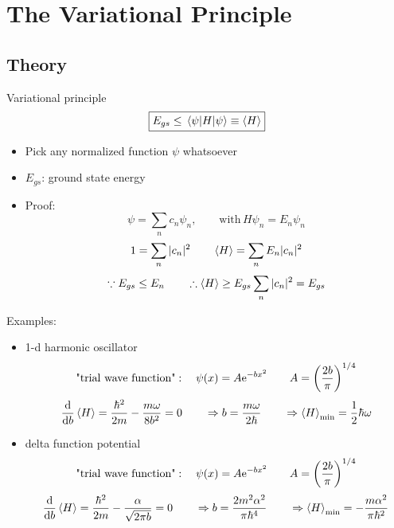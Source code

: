 \chapter{The  Variational Principle}
\section{Theory}
Variational principle
\[\boxed{E_{gs}\leq\expval{H}{\psi}\equiv\expval{H}}\]
\begin{itemize}
    \item Pick any normalized function \(\psi\) whatsoever
    \item \(E_{gs}\): ground state energy
    \item Proof:
    \[\psi=\sum_nc_n\psi_n,\qquad\text{with} \,H\psi_n = E_n\psi_n \]
    \[\begin{aligned}
        1=\sum_n|c_n|^2 \qquad\expval{H} = \sum_n E_n|c_n|^2 
    \end{aligned} \]
    \[\because E_{gs}\leq E_n \qquad \therefore \expval{H}\geq E_{gs}\sum_n|c_n|^2=E_{gs}\]
\end{itemize}
Examples:
\begin{itemize}
    \item 1-d harmonic oscillator
    \[\text{"trial wave function"}:\quad \psi(x)=A{\rm e}^{-bx^2} \qquad A=\qty(\frac{2b}{\pi})^{1/4}\]
    \[\dv{b}\expval{H}=\frac{\hbar^2}{2m}-\frac{m\omega}{8b^2}=0\qquad\Rightarrow b=\frac{m\omega}{2\hbar} \qquad\Rightarrow \expval{H}_{\min}=\frac{1}{2}\hbar\omega\]
    \item delta function potential
    \[\text{"trial wave function"}:\quad \psi(x)=A{\rm e}^{-bx^2} \qquad A=\qty(\frac{2b}{\pi})^{1/4}\]
    \[\dv{b}\expval{H}=\frac{\hbar^2}{2m}-\frac{\alpha}{\sqrt{2\pi b}}=0 
       \qquad\Rightarrow b=\frac{2m^2\alpha^2}{\pi\hbar^4}
       \qquad\Rightarrow \expval{H}_{\min}=-\frac{m\alpha^2}{\pi \hbar^2}\]
\end{itemize}
